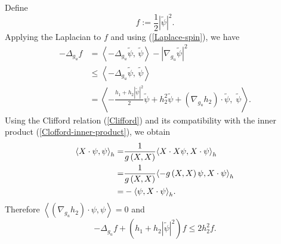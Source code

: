 \documentclass[a4paper, 12pt]{article}
\begin{document}
Define
\[
f := \frac12 \left| {\tilde \psi } \right|^2.
\]
Applying the Laplacian to \( f \) and using (\ref{Laplace-spin}), we have
\begin{equation}\label{struc-control}
	\begin{aligned}
		-\Delta_{g_u} f
		&= \left\langle { -\Delta_{g_u}\tilde{\psi},\,\tilde{\psi}} \right\rangle
		- |\nabla_{g_u}\tilde{\psi}|^2 \\
		&\le \left\langle { -\Delta_{g_u}\tilde{\psi},\,\tilde{\psi}} \right\rangle  \\
		&= \left\langle
		-\frac{h_1+h_2\left| {\tilde \psi } \right|^2}{2}\tilde{\psi}
		+ h_2^2\tilde{\psi} + (\nabla_{g_u}h_2)\cdot\tilde{\psi},
		\;\tilde{\psi}\right\rangle .
	\end{aligned}
\end{equation}
Using the Clifford relation (\ref{Clifford}) and its compatibility with the inner product (\ref{Clofford-inner-product}), we obtain
\[\begin{aligned}
	{\left\langle {X \cdot \psi ,\psi } \right\rangle _h} =& \frac{1}{{g\left( {X,X} \right)}}{\left\langle {X \cdot X\psi ,X \cdot \psi } \right\rangle _h} \hfill \\
	=& \frac{1}{{g\left( {X,X} \right)}}{\left\langle { - g\left( {X,X} \right)\psi ,X \cdot \psi } \right\rangle _h} \hfill \\
	=&  - {\left\langle {\psi ,X \cdot \psi } \right\rangle _h} .
\end{aligned} \]
Therefore $\left\langle {\left( {{\nabla _{{g_u}}}{h_2}} \right) \cdot \psi ,\psi } \right\rangle  = 0$ and
\begin{equation}\label{laplace}
	- {\Delta _{{g_u}}}f + \left( {{h_1} + {h_2}{{\left| {\tilde \psi } \right|}^2}} \right)f \leq 2h_2^2f.
\end{equation}
\end{document}
